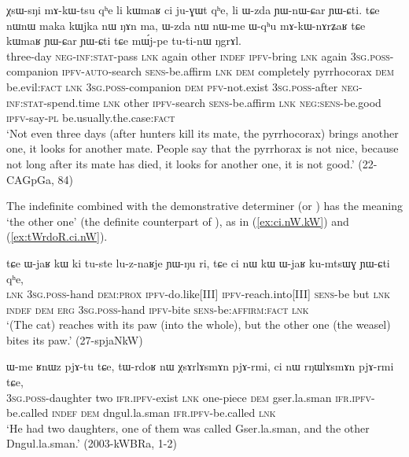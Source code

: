  \begin{exe}
\ex \label{ex:kWmaR.ci.juGWt}
\gll  χsɯ-sŋi mɤ-kɯ-tsu qʰe li kɯmaʁ ci ju-ɣɯt qʰe, li ɯ-zda ɲɯ-nɯ-ɕar ɲɯ-ɕti.
tɕe nɯnɯ maka kɯjka nɯ ŋɤn ma, ɯ-zda nɯ nɯ-me ɯ-qʰu mɤ-kɯ-nɤrʑaʁ tɕe kɯmaʁ ɲɯ-ɕar ɲɯ-ɕti tɕe mɯ́j-pe tu-ti-nɯ ŋgrɤl. \\
three-day \textsc{neg}-\textsc{inf}:\textsc{stat}-pass \textsc{lnk} again other \textsc{indef} \textsc{ipfv}-bring \textsc{lnk} again \textsc{3sg}.\textsc{poss}-companion \textsc{ipfv}-\textsc{auto}-search \textsc{sens}-be.affirm \textsc{lnk} \textsc{dem} completely pyrrhocorax \textsc{dem} be.evil:\textsc{fact} \textsc{lnk} \textsc{3sg}.\textsc{poss}-companion \textsc{dem}  \textsc{pfv}-not.exist \textsc{3sg}.\textsc{poss}-after \textsc{neg}-\textsc{inf}:\textsc{stat}-spend.time \textsc{lnk} other \textsc{ipfv}-search \textsc{sens}-be.affirm \textsc{lnk} \textsc{neg}:\textsc{sens}-be.good \textsc{ipfv}-say-\textsc{pl} be.usually.the.case:\textsc{fact} \\
\glt `Not even three days (after hunters kill its mate, the pyrrhocorax) brings another one, it looks for another mate. People say that the pyrrhorax is not nice, because not long after its mate has died, it looks for another one, it is not good.' (22-CAGpGa, 84)
\end{exe}

The indefinite  combined with the demonstrative determiner  (or ) has the meaning `the other one' (the definite counterpart of ), as in (\ref{ex:ci.nW.kW}) and (\ref{ex:tWrdoR.ci.nW}).

\begin{exe}
\ex \label{ex:ci.nW.kW}
 \gll tɕe ɯ-jaʁ kɯ ki tu-ste lu-z-naʁje ɲɯ-ŋu ri, tɕe ci nɯ kɯ ɯ-jaʁ ku-mtsɯɣ ɲɯ-ɕti qʰe, \\
 \textsc{lnk} \textsc{3sg.poss}-hand \textsc{dem:prox} \textsc{ipfv}-do.like[III]  \textsc{ipfv}-reach.into[III] \textsc{sens}-be but \textsc{lnk} \textsc{indef} \textsc{dem} \textsc{erg} \textsc{3sg.poss}-hand  \textsc{ipfv}-bite \textsc{sens}-be:\textsc{affirm:fact} \textsc{lnk} \\
\glt `(The cat) reaches with its paw (into the whole), but the other one (the weasel) bites its paw.' (27-spjaNkW)
\end{exe}

\begin{exe}
\ex \label{ex:tWrdoR.ci.nW}
 \gll 
ɯ-me ʁnɯz pjɤ-tu tɕe, tɯ-rdoʁ nɯ χsɤrlɤsmɤn pjɤ-rmi, ci nɯ rŋɯlɤsmɤn pjɤ-rmi tɕe, \\
\textsc{3sg.poss}-daughter two \textsc{ifr.ipfv}-exist \textsc{lnk} one-piece \textsc{dem} gser.la.sman \textsc{ifr.ipfv}-be.called \textsc{indef} \textsc{dem} dngul.la.sman \textsc{ifr.ipfv}-be.called \textsc{lnk} \\
\glt `He had two daughters, one of them was called Gser.la.sman, and the other Dngul.la.sman.' (2003-kWBRa, 1-2)
\end{exe}

